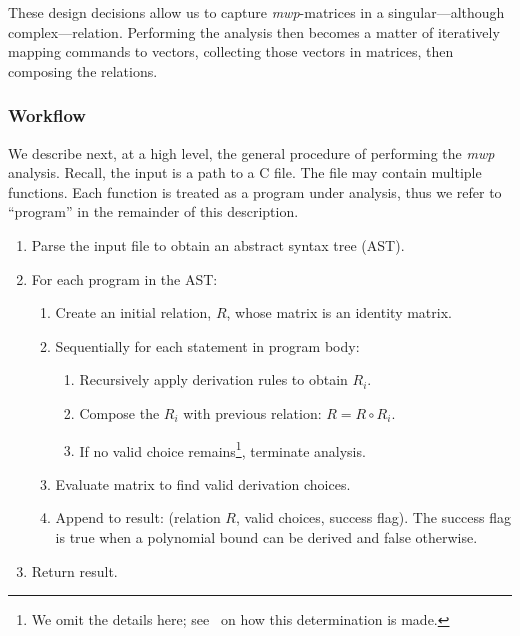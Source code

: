 {{\begin{example}
    \end{example}

   These design decisions allow us to capture \emph{mwp}-matrices in a singular---although complex---relation.
   Performing the analysis then becomes a matter of iteratively mapping commands to vectors, collecting those vectors in matrices,
   then composing the relations.

    \subsubsection{Workflow}

    We describe next, at a high level, the general procedure of performing the \emph{mwp} analysis. Recall, the input is
    a path to a C file. The file may contain multiple functions. Each function is treated as a program under analysis,
    thus we refer to \enquote{program} in the remainder of this description.

    \begin{enumerate}
        \item Parse the input file to obtain an abstract syntax tree (AST).
        \item For each program in the AST:
        \begin{enumerate}
            \item Create an initial relation, $R$, whose matrix is an identity matrix.
            \item Sequentially for each statement in program body:
            \begin{enumerate}
                \item Recursively apply derivation rules to obtain $R_i$.
                \item Compose the $R_i$ with previous relation: $R = R \circ R_i$.
                \item If no valid choice remains\footnote{%
                    We omit the details here; see~\cite[Section 4.4]{Aubert2022b} on how this
                    determination is made.}, terminate analysis.
            \end{enumerate}
            \item Evaluate matrix to find valid derivation choices.
            \item Append to result: (relation $R$, valid choices, success flag).
            The success flag is true when a polynomial bound can be derived and
            false otherwise.
        \end{enumerate}
        \item Return result.
    \end{enumerate}


}}
